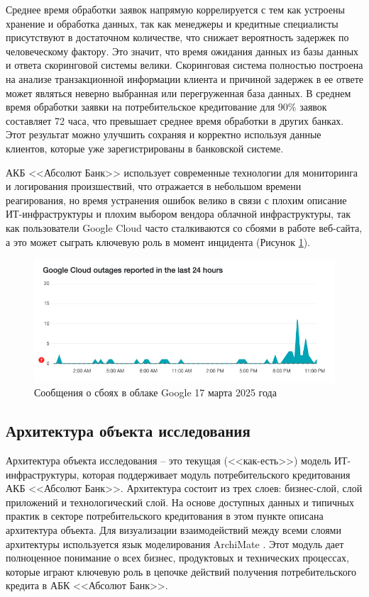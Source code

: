 \documentclass[14pt, a4paper]{extarticle}
\begin{document}
Среднее время обработки заявок напрямую коррелируется с тем как устроены
хранение и обработка данных, так как менеджеры и кредитные специалисты
присутствуют в достаточном количестве, что снижает вероятность задержек по
человеческому фактору. Это значит, что время ожидания данных из базы данных и
ответа скоринговой системы велики. Скоринговая система полностью построена на
анализе транзакционной информации клиента и причиной задержек в ее ответе может
являться неверно выбранная или перегруженная база данных. В среднем время
обработки заявки на потребительское кредитование для 90\% заявок составляет 72
часа, что превышает среднее время обработки в других банках. Этот результат
можно улучшить сохраняя и корректно используя данные клиентов, которые уже
зарегистрированы в банковской системе.

АКБ <<Абсолют Банк>> использует современные технологии для мониторинга и
логирования произшествий, что отражается в небольшом времени реагирования, но
время устранения ошибок велико в связи с плохим описание ИТ-инфраструктуры и
плохим выбором вендора облачной инфраструктуры, так как пользователи Google
Cloud часто сталкиваются со сбоями в работе веб-сайта, а это может
сыграть ключевую роль в момент инцидента (Рисунок
\ref{fig:google_cloud_downtime}).

\begin{figure}[H]
	\centering
	\includegraphics[scale=0.48]{google_cloud_downtime.png}
	\caption{Сообщения о сбоях в облаке Google 17 марта 2025 года}
	\label{fig:google_cloud_downtime}
\end{figure}

\subsection{Архитектура объекта исследования}

Архитектура объекта исследования -- это текущая (<<как-есть>>) модель
ИТ-инфраструктуры, которая поддерживает модуль потребительского кредитования
АКБ <<Абсолют Банк>>. Архитектура состоит из трех слоев: бизнес-слой, слой
приложений и технологический слой. На основе доступных данных и типичных
практик в секторе потребительского кредитования в этом пункте описана
архитектура объекта. Для визуализации взаимодействий между всеми слоями
архитектуры используется язык моделирования ArchiMate \cite{archimate-landing}.
Этот модуль дает полноценное понимание о всех бизнес, продуктовых и технических
процессах, которые играют ключевую роль в цепочке действий получения
потребительского кредита в АБК <<Абсолют Банк>>.
\end{document}
